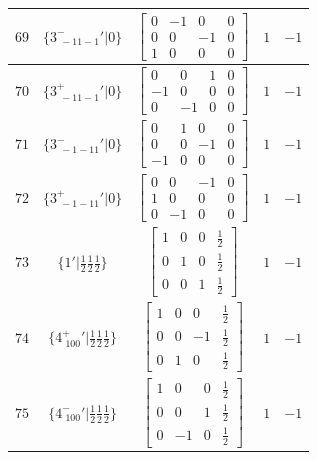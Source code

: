 \documentclass[fleqn,8pt]{jsarticle}
\begin{document}
\begin{longtable}{ccccc}
$ 69 $ & $ \{3^{-}_{\,\,-11-1}{}'|0\} $ & $ \begin{bmatrix} 0 & -1 & 0 & 0 \\ 0 & 0 & -1 & 0 \\ 1 & 0 & 0 & 0 \end{bmatrix} $ & $ 1 $ & $ -1 $ \\ \hline
$ 70 $ & $ \{3^{+}_{\,\,-11-1}{}'|0\} $ & $ \begin{bmatrix} 0 & 0 & 1 & 0 \\ -1 & 0 & 0 & 0 \\ 0 & -1 & 0 & 0 \end{bmatrix} $ & $ 1 $ & $ -1 $ \\ \hline
$ 71 $ & $ \{3^{-}_{\,\,-1-11}{}'|0\} $ & $ \begin{bmatrix} 0 & 1 & 0 & 0 \\ 0 & 0 & -1 & 0 \\ -1 & 0 & 0 & 0 \end{bmatrix} $ & $ 1 $ & $ -1 $ \\ \hline
$ 72 $ & $ \{3^{+}_{\,\,-1-11}{}'|0\} $ & $ \begin{bmatrix} 0 & 0 & -1 & 0 \\ 1 & 0 & 0 & 0 \\ 0 & -1 & 0 & 0 \end{bmatrix} $ & $ 1 $ & $ -1 $ \\ \hline
$ 73 $ & $ \{1{}'|\frac{1}{2} \frac{1}{2} \frac{1}{2}\} $ & $ \begin{bmatrix} 1 & 0 & 0 & \frac{1}{2} \\ 0 & 1 & 0 & \frac{1}{2} \\ 0 & 0 & 1 & \frac{1}{2} \end{bmatrix} $ & $ 1 $ & $ -1 $ \\ \hline
$ 74 $ & $ \{4^{+}_{\,\,100}{}'|\frac{1}{2} \frac{1}{2} \frac{1}{2}\} $ & $ \begin{bmatrix} 1 & 0 & 0 & \frac{1}{2} \\ 0 & 0 & -1 & \frac{1}{2} \\ 0 & 1 & 0 & \frac{1}{2} \end{bmatrix} $ & $ 1 $ & $ -1 $ \\ \hline
$ 75 $ & $ \{4^{-}_{\,\,100}{}'|\frac{1}{2} \frac{1}{2} \frac{1}{2}\} $ & $ \begin{bmatrix} 1 & 0 & 0 & \frac{1}{2} \\ 0 & 0 & 1 & \frac{1}{2} \\ 0 & -1 & 0 & \frac{1}{2} \end{bmatrix} $ & $ 1 $ & $ -1 $ \\ \hline

\end{longtable}
\end{document}
